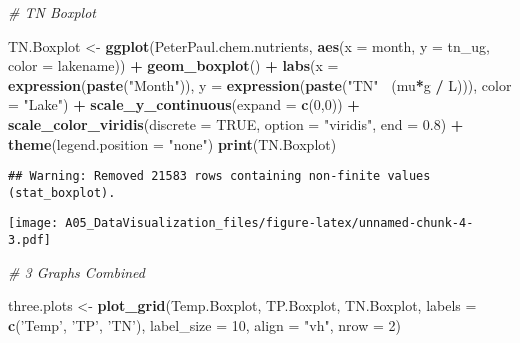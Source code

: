 \documentclass[]{article}
\newenvironment{Shaded}{\begin{snugshade}}{\end{snugshade}}
\newcommand{\KeywordTok}[1]{\textcolor[rgb]{0.13,0.29,0.53}{\textbf{#1}}}
\newcommand{\DataTypeTok}[1]{\textcolor[rgb]{0.13,0.29,0.53}{#1}}
\newcommand{\DecValTok}[1]{\textcolor[rgb]{0.00,0.00,0.81}{#1}}
\newcommand{\FloatTok}[1]{\textcolor[rgb]{0.00,0.00,0.81}{#1}}
\newcommand{\StringTok}[1]{\textcolor[rgb]{0.31,0.60,0.02}{#1}}
\newcommand{\CommentTok}[1]{\textcolor[rgb]{0.56,0.35,0.01}{\textit{#1}}}
\newcommand{\OtherTok}[1]{\textcolor[rgb]{0.56,0.35,0.01}{#1}}
\newcommand{\OperatorTok}[1]{\textcolor[rgb]{0.81,0.36,0.00}{\textbf{#1}}}
\newcommand{\NormalTok}[1]{#1}
\begin{document}
\begin{Shaded}
\begin{Highlighting}[]
\CommentTok{# TN Boxplot}

\NormalTok{TN.Boxplot <-}\StringTok{ }
\StringTok{  }\KeywordTok{ggplot}\NormalTok{(PeterPaul.chem.nutrients, }\KeywordTok{aes}\NormalTok{(}\DataTypeTok{x =}\NormalTok{ month, }\DataTypeTok{y =}\NormalTok{ tn_ug, }\DataTypeTok{color =}\NormalTok{ lakename)) }\OperatorTok{+}
\StringTok{  }\KeywordTok{geom_boxplot}\NormalTok{() }\OperatorTok{+}
\StringTok{  }\KeywordTok{labs}\NormalTok{(}\DataTypeTok{x =} \KeywordTok{expression}\NormalTok{(}\KeywordTok{paste}\NormalTok{(}\StringTok{"Month"}\NormalTok{)),}
       \DataTypeTok{y =} \KeywordTok{expression}\NormalTok{(}\KeywordTok{paste}\NormalTok{(}\StringTok{"TN"}\OperatorTok{~}\StringTok{ }\NormalTok{(mu}\OperatorTok{*}\NormalTok{g }\OperatorTok{/}\StringTok{ }\NormalTok{L))), }\DataTypeTok{color =} \StringTok{"Lake"}\NormalTok{) }\OperatorTok{+}
\StringTok{   }\KeywordTok{scale_y_continuous}\NormalTok{(}\DataTypeTok{expand =} \KeywordTok{c}\NormalTok{(}\DecValTok{0}\NormalTok{,}\DecValTok{0}\NormalTok{)) }\OperatorTok{+}
\StringTok{  }\KeywordTok{scale_color_viridis}\NormalTok{(}\DataTypeTok{discrete =} \OtherTok{TRUE}\NormalTok{, }\DataTypeTok{option =} \StringTok{"viridis"}\NormalTok{, }\DataTypeTok{end =} \FloatTok{0.8}\NormalTok{) }\OperatorTok{+}
\StringTok{  }\KeywordTok{theme}\NormalTok{(}\DataTypeTok{legend.position =} \StringTok{"none"}\NormalTok{)}
\KeywordTok{print}\NormalTok{(TN.Boxplot)}
\end{Highlighting}
\end{Shaded}

\begin{verbatim}
## Warning: Removed 21583 rows containing non-finite values (stat_boxplot).
\end{verbatim}

\texttt{[image: A05\_DataVisualization\_files/figure-latex/unnamed-chunk-4-3.pdf]}

\begin{Shaded}
\begin{Highlighting}[]
\CommentTok{# 3 Graphs Combined}


\NormalTok{three.plots <-}\StringTok{ }\KeywordTok{plot_grid}\NormalTok{(Temp.Boxplot, TP.Boxplot, TN.Boxplot, }\DataTypeTok{labels =} \KeywordTok{c}\NormalTok{(}\StringTok{'Temp'}\NormalTok{, }\StringTok{'TP'}\NormalTok{, }\StringTok{'TN'}\NormalTok{), }
                         \DataTypeTok{label_size =} \DecValTok{10}\NormalTok{, }\DataTypeTok{align =} \StringTok{"vh"}\NormalTok{, }\DataTypeTok{nrow =} \DecValTok{2}\NormalTok{)}
\end{Highlighting}
\end{Shaded}
\end{document}
